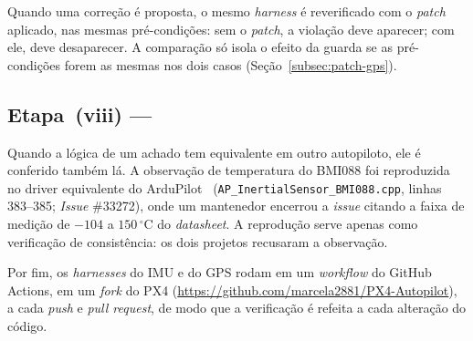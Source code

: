 Quando uma correção é proposta, o mesmo \textit{harness} é reverificado com
o \textit{patch} aplicado, nas mesmas pré-condições: sem o \textit{patch}, a
violação deve aparecer; com ele, deve desaparecer. A comparação só isola o efeito
da guarda se as pré-condições forem as mesmas nos dois casos
(Seção~\ref{subsec:patch-gps}).

\subsection{Etapa~(viii) --- }
\label{subsec:etapa-ardupilot-ci}

Quando a lógica de um achado tem equivalente em outro autopiloto, ele é
conferido também lá.  A observação de temperatura do BMI088 foi reproduzida
no driver equivalente do ArduPilot~\cite{ArduPilot}
(\texttt{AP\_InertialSensor\_BMI088.cpp}, linhas 383--385; \textit{Issue}
\#33272), onde um mantenedor encerrou a \textit{issue} citando a faixa de
medição de $-104$ a $150\,^{\circ}$C do \textit{datasheet}. A reprodução serve
apenas como verificação de consistência: os dois projetos recusaram a
observação.


Por fim, os \textit{harnesses} do IMU e do GPS rodam em um
\textit{workflow} do GitHub Actions, em um \textit{fork} do PX4
(\url{https://github.com/marcela2881/PX4-Autopilot}), a cada \textit{push} e
\textit{pull request}, de modo que a verificação é refeita a cada alteração do
código.


